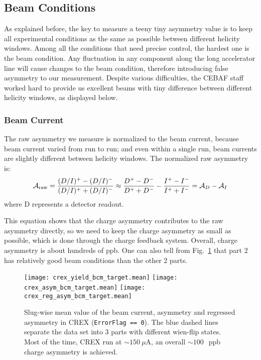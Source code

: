 \subsection{Beam Conditions}
As explained before, the key to measure a teeny tiny asymmetry value is to 
keep all experimental conditions as the same as possible between different 
helicity windows. Among all the conditions that need precise control, the 
hardest one is the beam condition. Any fluctuation in any component along the 
long accelerator line will cause changes to the beam condition, therefore introducing false 
asymmetry to our measurement. Despite various difficulties, the CEBAF staff worked 
hard to provide us excellent beams with tiny difference between different helicity 
windows, as displayed below.

\subsubsection{Beam Current}
The raw asymmetry we measure is normalized to the beam current, because beam
current varied from run to run; and even within a single run, beam currents are 
slightly different between helicity windows. The normalized raw asymmetry is:
\begin{equation}
    \mathcal{A}_{\text{raw}} = \frac{(D/I)^+ - (D/I)^-}{(D/I)^+ + (D/I)^-}
	\approx \frac{D^+ - D^-}{D^+ + D^-} - \frac{I^+ - I^-}{I^+ + I^-}
	= \mathcal{A}_D - \mathcal{A}_I
\end{equation}
where D represents a detector readout.

This equation shows that the charge asymmetry contributes to the raw asymmetry directly, 
so we need to keep the charge asymmetry as small as possible, which is done 
through the charge feedback system. Overall, charge asymmetry is about hundreds of ppb. 
One can also tell from Fig.~\ref{fig:crex_bcm_target}
that part 2 has relatively good beam conditions than the other 2 parts.
\begin{figure}[H]
    \centering
    \texttt{[image: crex\_yield\_bcm\_target.mean]}
    \texttt{[image: crex\_asym\_bcm\_target.mean]}
    \texttt{[image: crex\_reg\_asym\_bcm\_target.mean]}
    \caption{Slug-wise mean value of the beam current, asymmetry and regressed 
    asymmetry in CREX (\texttt{ErrorFlag == 0}). The blue dashed lines separate
    the data set into 3 parts with different wien-flip states.
    Most of the time, CREX run at $\sim 150\ \mu$A, an overall $\sim 100~$~ppb charge 
    asymmetry is achieved.}
    \label{fig:crex_bcm_target}
\end{figure}


